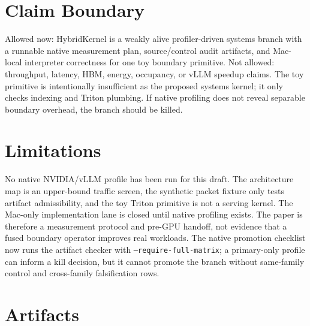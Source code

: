 \documentclass{article}
\begin{document}
\section{Claim Boundary}

Allowed now: HybridKernel is a weakly alive profiler-driven systems branch with a runnable native measurement plan, source/control audit artifacts, and Mac-local interpreter correctness for one toy boundary primitive. Not allowed: throughput, latency, HBM, energy, occupancy, or vLLM speedup claims. The toy primitive is intentionally insufficient as the proposed systems kernel; it only checks indexing and Triton plumbing. If native profiling does not reveal separable boundary overhead, the branch should be killed.

\section{Limitations}

No native NVIDIA/vLLM profile has been run for this draft. The architecture map is an upper-bound traffic screen, the synthetic packet fixture only tests artifact admissibility, and the toy Triton primitive is not a serving kernel. The Mac-only implementation lane is closed until native profiling exists. The paper is therefore a measurement protocol and pre-GPU handoff, not evidence that a fused boundary operator improves real workloads.
The native promotion checklist now runs the artifact checker with
\texttt{--require-full-matrix}; a primary-only profile can inform a kill
decision, but it cannot promote the branch without same-family control and
cross-family falsification rows.

\section{Artifacts}
\end{document}
